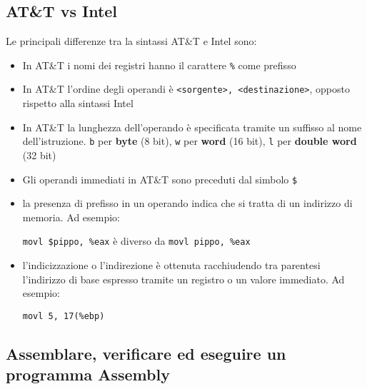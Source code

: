 \documentclass[a4paper]{article}
\theoremstyle{break}
\theoremstyle{break}
\theoremstyle{break}
\theoremstyle{break}
\begin{document}
\subsection{AT\&T vs Intel}
Le principali differenze tra la sintassi AT\&T e Intel sono:
\begin{itemize}
	\item In AT\&T i nomi dei registri hanno il carattere \texttt{\%} come prefisso
	\item In AT\&T l'ordine degli operandi è \texttt{<sorgente>, <destinazione>}, opposto
	      rispetto alla sintassi Intel
	\item In AT\&T la lunghezza dell'operando è specificata tramite un suffisso al nome
	      dell'istruzione. \texttt{b} per \textbf{byte} (8 bit), \texttt{w} per \textbf{word} (16 bit),
	      \texttt{l} per \textbf{double word} (32 bit)
	\item Gli operandi immediati in AT\&T sono preceduti dal simbolo \texttt{\$}
	\item la presenza di prefisso in un operando indica che si tratta di un
	      indirizzo di memoria. Ad esempio:
	      \begin{center}
		      \texttt{movl \$pippo, \%eax} \quad è diverso da \quad \texttt{movl pippo, \%eax}
	      \end{center}
	\item l'indicizzazione o l'indirezione è ottenuta racchiudendo tra parentesi
	      l'indirizzo di base espresso tramite un registro o un valore immediato.
	      Ad esempio:
	      \begin{center}
		      \texttt{movl 5, 17(\%ebp)}
	      \end{center}
\end{itemize}

\subsection{Assemblare, verificare ed eseguire un programma Assembly}
%
%   
\end{document}
